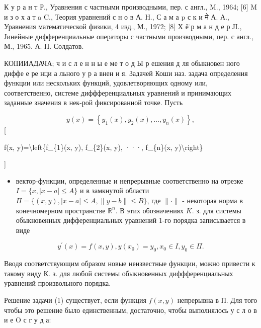 \documentclass[10pt]{article}
\begin{document}
К у р а н т Р., Уравнения с частными производными, пер. с англ., M., 1964; [6] M и з о х а т a C., Теория уравнений с н о в А. Н., С а м а p с к и मे А. А., Уравнения математической физики, 4 изд., М., 1972; [8] Х ё̈ р м а н д е р ЈI., Јинейные дифференциальные операторы с частными производными, пер. с англ., М., 1965. А. П. Солдатов.



КОІІИИАДАЧА; ч и с л е н н ы е ме т о д Ы р ешения д ля обыкновен ного диффе е ре нци а льного у р а внен и я. Задачей Коши наз. задача определения функции или нескольких функций, удовлетворяющих одному или, соответственно, системе диффференциальных уравнений и принимающих заданные значения в нек-рой фиксированной точке. Пусть



\[

y(x)=\left\{y_{1}(x), y_{2}(x), \ldots, y_{n}(x)\right\},

\][



f(x, y)=\textbackslash left\{f\_\{1\}(x, y), f\_\{2\}(x, y), ···, f\_\{n\}(x, y)\textbackslash right\}

]



\begin{itemize}

  \item вектор-функции, определенные и непрерывные соответственно на отрезке $I=\{x,|x-a| \leqslant A\}$ и в замкнутой области $\Pi=\{(x, y),|x-a| \leqslant A,\|y-b\| \leqslant B\}$, где $\|\cdot\|$ - некоторая норма в конечномерном пространстве $\mathbb{R}^{n}$. В этих обозначениях $K$. з. для системы обыкновенных дифференциальных уравнений 1-го порядка записывается в виде

\end{itemize}



\[

y^{\prime}(x)=f(x, y), y\left(x_{0}\right)=y_{0}, x_{0} \in I, y_{0} \in \Pi .

\]



Вводя соответствующим образом новые неизвестные функции, можно привести к такому виду К. з. для любой системы обыкновенных диффференциальных уравнений произвольного порядка.



Решение задачи (1) существует, если функция $f(x, y)$ непрерывна в П. Для того чтобы это решение было единственным, достаточно, чтобы выполнялось у с л о в и е O с г у д а:
\end{document}
